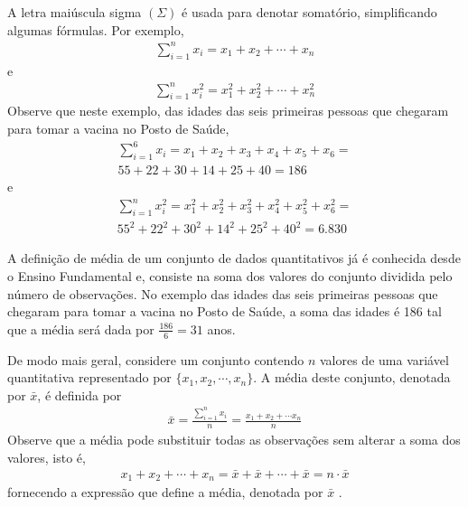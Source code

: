 A letra maiúscula sigma \(\left (\Sigma\right )\) é usada para denotar somatório, simplificando algumas fórmulas. Por exemplo,
\begin{equation*}
\begin{split}\sum^n_{i=1} x_i=x_1+x_2+\cdots +x_n\end{split}
\end{equation*}
e
\begin{equation*}
\begin{split}\sum^n_{i=1} x^2_i=x^2_1+x^2_2+\cdots +x^2_n\end{split}
\end{equation*}
Observe que neste exemplo, das idades das seis primeiras pessoas que chegaram para tomar a vacina no Posto de Saúde,
\begin{equation*}
\begin{split}\sum^6_{i=1}x_i=x_1+x_2+x_3+x_4+x_5+x_6=\\
55 + 22 + 30 + 14 + 25 + 40 = 186\end{split}
\end{equation*}
e
\begin{equation*}
\begin{split}\sum^n_{i=1} x^2_i=x^2_1+x^2_2+x^2_3+x^2_4+x^2_5 +x^2_6=\\
55^2+ 22^2+ 30^2+ 14^2+ 25^2+  40^2=6.830\end{split}
\end{equation*}

A definição de média de um conjunto de dados quantitativos já é conhecida desde o Ensino Fundamental e, consiste na soma dos valores do conjunto dividida pelo número de observações. No exemplo das idades das seis primeiras pessoas que chegaram para tomar a vacina no Posto de Saúde, a soma das idades é 186 tal que a média será dada por \(\frac{186}{6}=31\) anos.

De modo mais geral, considere um conjunto contendo \(n\) valores de uma variável quantitativa representado por \(\{x_1,x_2,\cdots,x_n\}\).
A média deste conjunto, denotada por \(\bar{x}\),  é definida por
\begin{equation*}
\begin{split}\bar{x}=\frac{\sum^n_{i=1}x_i}{n}=\frac{x_1+x_2+\cdots x_n}{n}\end{split}
\end{equation*}
Observe que a média pode substituir todas as observações sem alterar a  soma dos valores, isto é,
\begin{equation*}
\begin{split}x_1+x_2+\cdots+x_n=\bar{x}+\bar{x}+\cdots+\bar{x} = n\cdot \bar{x}\end{split}
\end{equation*}
fornecendo a expressão que define a média, denotada por \(\bar{x}\) .

